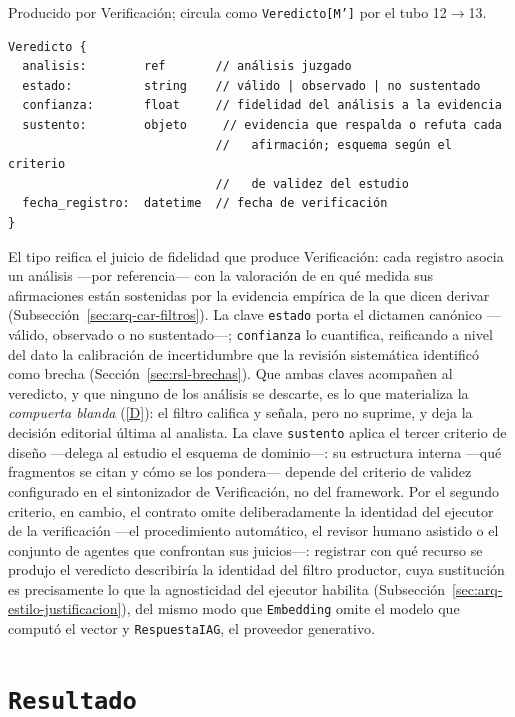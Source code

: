 \documentclass[12pt]{report}
\DeclareRobustCommand{\resp}[1]{\hyperref[tab:registro-responsabilidades]{\textcolor{respcolor}{[#1]}}}
\begin{document}
Producido por Verificación; circula como \texttt{Veredicto[M']} por el tubo 12\(\to\)13.

\noindent\begin{minipage}{\linewidth}
  \begin{lstlisting}[style=tipoanexo]
Veredicto {
  analisis:        ref       // análisis juzgado
  estado:          string    // válido | observado | no sustentado
  confianza:       float     // fidelidad del análisis a la evidencia
  sustento:        objeto     // evidencia que respalda o refuta cada
                             //   afirmación; esquema según el criterio
                             //   de validez del estudio
  fecha_registro:  datetime  // fecha de verificación
}
\end{lstlisting}
\end{minipage}

El tipo reifica el juicio de fidelidad que produce Verificación: cada registro asocia un análisis ---por referencia--- con la valoración de en qué medida sus afirmaciones están sostenidas por la evidencia empírica de la que dicen derivar (Subsección~\ref{sec:arq-car-filtros}). La clave \texttt{estado} porta el dictamen canónico ---válido, observado o no sustentado---; \texttt{confianza} lo cuantifica, reificando a nivel del dato la calibración de incertidumbre que la revisión sistemática identificó como brecha (Sección~\ref{sec:rsl-brechas}). Que ambas claves acompañen al veredicto, y que ninguno de los análisis se descarte, es lo que materializa la \textit{compuerta blanda} (\resp{D}): el filtro califica y señala, pero no suprime, y deja la decisión editorial última al analista. La clave \texttt{sustento} aplica el tercer criterio de diseño ---delega al estudio el esquema de dominio---: su estructura interna ---qué fragmentos se citan y cómo se los pondera--- depende del criterio de validez configurado en el sintonizador de Verificación, no del framework. Por el segundo criterio, en cambio, el contrato omite deliberadamente la identidad del ejecutor de la verificación ---el procedimiento automático, el revisor humano asistido o el conjunto de agentes que confrontan sus juicios---: registrar con qué recurso se produjo el veredicto describiría la identidad del filtro productor, cuya sustitución es precisamente lo que la agnosticidad del ejecutor habilita (Subsección~\ref{sec:arq-estilo-justificacion}), del mismo modo que \texttt{Embedding} omite el modelo que computó el vector y \texttt{RespuestaIAG}, el proveedor generativo.

\section{\texorpdfstring{\texttt{Resultado}}{Resultado}}
\label{anexo:tipo-resultado}
\end{document}
